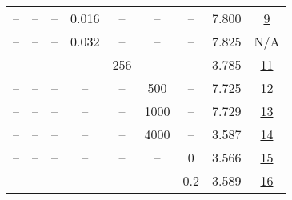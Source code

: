 \begin{table}[H]
\begin{tabular}{ccccccccc}
-- & -- & -- & 0.016 & -- & -- & -- & 7.800 & \href{https://wandb.ai/stanford-mercury/optimizer-scaling/runs/sweep-130m-2B-mini22b748lr0.016-wd0.1-minlr0-warmup2000-b10.9-b2-6d20c4}{9} \\
-- & -- & -- & 0.032 & -- & -- & -- & 7.825 & N/A \\
-- & -- & -- & -- & 256 & -- & -- & 3.785 & \href{https://wandb.ai/stanford-mercury/optimizer-scaling/runs/sweep-130m-2B-minidd6b61lr0.008-wd0.1-minlr0-warmup2000-b10.9-b2-b988c3}{11} \\
-- & -- & -- & -- & -- & 500 & -- & 7.725 & \href{https://wandb.ai/stanford-mercury/optimizer-scaling/runs/sweep-130m-2B-mini0c2c00lr0.008-wd0.1-minlr0-warmup500-b10.9-b20-8094ab}{12} \\
-- & -- & -- & -- & -- & 1000 & -- & 7.729 & \href{https://wandb.ai/stanford-mercury/optimizer-scaling/runs/sweep-130m-2B-minibd49d8lr0.008-wd0.1-minlr0-warmup1000-b10.9-b2-28a98b}{13} \\
-- & -- & -- & -- & -- & 4000 & -- & 3.587 & \href{https://wandb.ai/stanford-mercury/optimizer-scaling/runs/sweep-130m-2B-minif55f2dlr0.008-wd0.1-minlr0-warmup4000-b10.9-b2-b00ef5}{14} \\
-- & -- & -- & -- & -- & -- & 0 & 3.566 & \href{https://wandb.ai/stanford-mercury/optimizer-scaling/runs/sweep-130m-2B-mini73fab0lr0.008-wd0-minlr0-warmup2000-b10.9-b20.-aac58f}{15} \\
-- & -- & -- & -- & -- & -- & 0.2 & 3.589 & \href{https://wandb.ai/stanford-mercury/optimizer-scaling/runs/sweep-130m-2B-mini9fac99lr0.008-wd0.2-minlr0-warmup2000-b10.9-b2-86f1dc}{16} \\
\bottomrule
\end{tabular}
\end{table}

